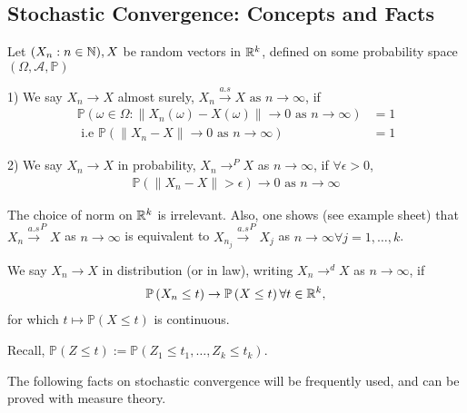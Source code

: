 \documentclass[a4paper]{article}
\begin{document}
\subsection*{Stochastic Convergence: Concepts and Facts}

\begin{defn}
	Let $(X_n: n \in \mathbb{N}), X$ be random vectors in $\mathbb{R}^{k}$, defined on some probability space $(\Omega, \mathcal{A}, \mathbb{P} )$

		1) We say $X_n\to X$ almost surely, $X_n \stackrel{a.s}{\to} X \text{ as } n\to \infty$, if
		\begin{align*}
			\mathbb{P}\left(\omega \in \Omega : \|X_n (\omega) - X(\omega)\| \to 0 \text{ as } n\to \infty \right) &= 1 \\
			\text{ i.e }\mathbb{P}\left(\|X_n - X\| \to  0 \text{ as } n\to \infty\right) &=1
		\end{align*}

		2) We say $X_n \to  X$ in probability, $X_n \to ^{P} X$ as $n\to \infty$, if $\forall \epsilon > 0$,
		\begin{align*}
			\mathbb{P}\left( \|X_n - X\| > \epsilon\right) \to 0 \text{ as } n \to \infty
		\end{align*}
		
\end{defn}

\begin{remark}
	The choice of norm on $\mathbb{R}^{k}$ is irrelevant. Also, one shows (see example sheet) that $X_n \stackrel{a.s}{\to}^{P} X$ as $n\to \infty$ is equivalent to $X_{n_{j}} \stackrel{a.s}{\to } ^{P} X_j $ as $n\to \infty \forall j = 1, \ldots, k$.
\end{remark}

\begin{defn}
	We say $X_n \to X$ in distribution (or in law), writing $X_n \to ^{d} X$ as $n \to \infty$, if
	\begin{align*}
		\mathbb{P}\left(X_n \le t\right) \to \mathbb{P}\left( X \le t \right) \forall t \in \mathbb{R}^{k}
	,\end{align*}
	for which $t \mapsto \mathbb{P}\left( X \le t \right) $ is continuous.
\end{defn}

Recall, $\mathbb{P}( Z\le t) := \mathbb{P}\left( Z_1 \le t_1, \ldots, Z_k \le t_k \right).$

The following facts on stochastic convergence will be frequently used, and can be proved with measure theory.
\end{document}
